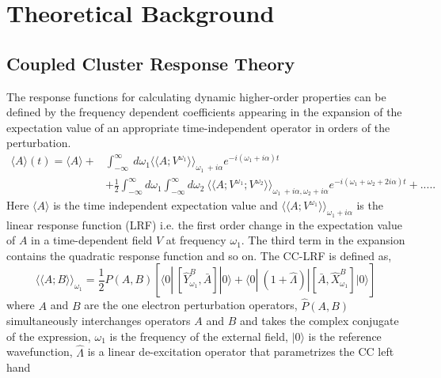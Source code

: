 \section{Theoretical Background}

\subsection{Coupled Cluster Response Theory}

The response functions for calculating dynamic higher-order properties 
can be defined by the frequency dependent coefficients appearing in the 
expansion of the expectation value of an appropriate time-independent 
operator in orders of the perturbation\cite{Koch90}.
\begin{equation}
\begin{split}
\langle A \rangle (t) = \langle A \rangle + & \int_{-\infty}^{\infty}\
d\omega_1{\langle\langle A;V^{\omega_1}\rangle\rangle}_{\omega_1  \
+ i\alpha}e^{-i(\omega_1 + i\alpha)t} \\
& + \frac{1}{2} \int_{-\infty}^{\infty}d\omega_1\int_{-\infty}^{\infty}d\omega_2\
{\langle\langle A;V^{\omega_1};V^{\omega_2}\rangle\rangle}_{\omega_1 \
+ i\alpha,\omega_2 + i\alpha}e^{-i(\omega_1 + \omega_2 + 2i\alpha)t} + .....
\end{split}
\end{equation}
Here $\langle A \rangle$ is the time independent expectation value and
${\langle\langle A;V^{\omega_1}\rangle\rangle}_{\omega_1 + i\alpha}$
is the linear response function (LRF) i.e. the first order change in the expectation value of $A$ in a time-dependent field $V$ at frequency $\omega_1$. The third term in the expansion contains the quadratic response function and so on. The CC-LRF is defined as,
\begin{equation}
{\langle\langle A;B\rangle\rangle}_{\omega_1} =  \frac{1}{2}\hat{P}(A,B)[\langle 0 | \
[\hat{Y}^{B}_{\omega_1}, \bar{A}]|0\rangle + \langle 0 | \
(1 + \hat{\Lambda})|[\bar{A},\hat{X}^{B}_{\omega_1}]|0\rangle]
\label{Eq:cclrf}
\end{equation}
where $A$ and $B$ are the one electron perturbation operators,
$\hat{P}(A,B)$ simultaneously interchanges operators $A$ and $B$
and takes the complex conjugate of the expression,
$\omega_1$ is the frequency of the external field, 
$|0\rangle$ is the reference wavefunction, $\hat{\Lambda}$ is 
a linear de-excitation operator that parametrizes the CC left hand 
